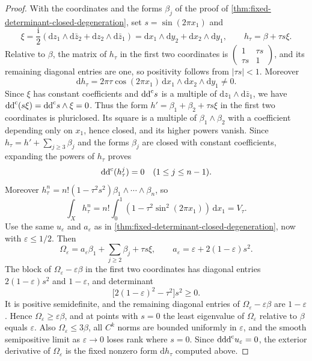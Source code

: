 \begin{proof}
With the coordinates and the forms $\beta_j$ of the proof of \cref{thm:fixed-determinant-closed-degeneration}, set $s=\sin(2\pi x_1)$ and
\[
 \xi=\frac{\mathrm i}2(\mathrm dz_1\wedge\mathrm d\bar z_2+\mathrm dz_2\wedge\mathrm d\bar z_1)
      =\mathrm dx_1\wedge\mathrm dy_2+\mathrm dx_2\wedge\mathrm dy_1,
 \qquad h_\tau=\beta+\tau s\xi.
\]
Relative to $\beta$, the matrix of $h_\tau$ in the first two coordinates is
$\left(\begin{smallmatrix}1&\tau s\\\tau s&1\end{smallmatrix}\right)$,
and its remaining diagonal entries are one, so positivity follows from $|\tau s|<1$. Moreover
\[
 \mathrm dh_\tau=2\pi\tau\cos(2\pi x_1)\,
                   \mathrm dx_1\wedge\mathrm dx_2\wedge\mathrm dy_1\ne0.
\]
Since $\xi$ has constant coefficients and $\mathrm{dd}^{\mathrm{c}} s$ is a multiple of $\mathrm dz_1\wedge\mathrm d\bar z_1$,
we have $\mathrm{dd}^{\mathrm{c}}(s\xi)=\mathrm{dd}^{\mathrm{c}} s\wedge\xi=0$. Thus the form $h'=\beta_1+\beta_2+\tau s\xi$ in the first two coordinates is pluriclosed.
Its square is a multiple of $\beta_1\wedge\beta_2$ with a coefficient depending only on $x_1$, hence closed, and its higher powers vanish. Since $h_\tau=h'+\sum_{j\geq3}\beta_j$ and the forms $\beta_j$ are closed with constant coefficients, expanding the powers of $h_\tau$ proves
\[
 \mathrm{dd}^{\mathrm{c}}(h_\tau^j)=0\quad(1\leq j\leq n-1).
\]
Moreover $h_\tau^n=n!(1-\tau^2s^2)\beta_1\wedge\cdots\wedge\beta_n$, so
\[
 \int_X h_\tau^n=n!\int_0^1(1-\tau^2\sin^2(2\pi x_1))\,\mathrm dx_1
                   =V_\tau.
\]
Use the same $u_\varepsilon$ and $a_\varepsilon$ as in
\cref{thm:fixed-determinant-closed-degeneration}, now with $\varepsilon\leq1/2$. Then
\[
 \Omega_\varepsilon=a_\varepsilon\beta_1+
       \sum_{j\geq2}\beta_j+\tau s\xi,
 \qquad a_\varepsilon=\varepsilon+2(1-\varepsilon)s^2.
\]
The block of $\Omega_\varepsilon-\varepsilon\beta$ in the first two coordinates has
diagonal entries $2(1-\varepsilon)s^2$ and $1-\varepsilon$, and
determinant
\[
 \bigl[2(1-\varepsilon)^2-\tau^2\bigr]s^2\geq0.
\]
It is positive semidefinite, and the remaining diagonal entries of $\Omega_\varepsilon-\varepsilon\beta$ are
$1-\varepsilon$. Hence $\Omega_\varepsilon\geq\varepsilon\beta$,
and at points with $s=0$ the least eigenvalue of $\Omega_\varepsilon$ relative to $\beta$ equals $\varepsilon$.
Also $\Omega_\varepsilon\leq3\beta$, all $C^k$ norms
are bounded uniformly in $\varepsilon$, and the smooth semipositive limit as $\varepsilon\to0$ loses rank
where $s=0$. Since $\mathrm d\mathrm{dd}^{\mathrm{c}} u_\varepsilon=0$, the exterior derivative of $\Omega_\varepsilon$
is the fixed nonzero form $\mathrm dh_\tau$ computed above.


\end{proof}
